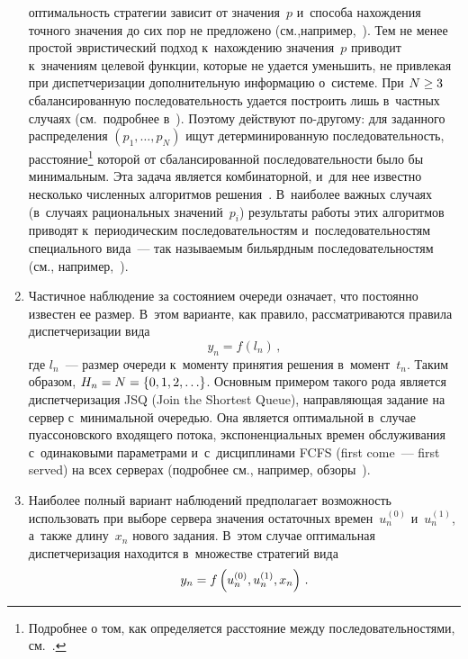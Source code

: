 \begin{multicols}{2}
\begin{enumerate}[1.]
оптимальность стратегии зависит от значения~$p$ и~способа нахождения точного 
значения до сих пор не предложено (см.,\linebreak например,~\cite{18-kon, 17-kon}). Тем не менее 
простой эвристический подход к~нахождению значения~$p$ приводит к~значениям 
целевой функции, которые не удается уменьшить, не привлекая при диспетчеризации 
дополнительную информацию о~системе. При $N\hm\geq 3$ сбалансированную 
последовательность удается построить лишь в~частных случаях (см.\ 
подробнее в~\cite{1-kon, 6-kon}). Поэтому действуют по-дру\-го\-му: для заданного 
распределения $(p_1,\ldots, p_N)$ ищут детерминированную последовательность, 
расстояние\footnote[1]{Подробнее о том, как определяется расстояние между последовательностями, 
см.~\cite{16-kon}.} которой от сбалансированной последовательности было бы 
минимальным. Эта задача является комбинаторной, и~для нее известно несколько 
численных алгоритмов решения~\cite{16-kon, 19-kon, 20-kon}. В~наиболее важных случаях 
(в~случаях рациональных значений~$p_i$) результаты работы этих алгоритмов приводят к~периодическим последовательностям и~последовательностям специального вида~--- так 
называемым бильярдным последовательностям (см., например,~\cite{16-kon}).
    \item Частичное наблюдение за состоянием очереди означает, что постоянно известен 
ее размер. В~этом варианте, как правило, рассматриваются правила диспетчеризации вида
    $$
    y_n=f(l_n)\,,
    $$
где $l_n$~--- размер очереди к~моменту принятия решения в~момент~$t_n$. Таким 
образом, $H_n\hm= N\hm= \{0,1,2,\ldots\}$. Основным примером такого рода является 
диспетчеризация JSQ (Join the Shortest Queue), направляющая задание на сервер с~минимальной очередью. Она 
является оптимальной в~случае пуассоновского входящего потока, экспоненциальных 
времен обслуживания с~одинаковыми параметрами и~с~дисциплинами FCFS (first come~--- first served)
на всех 
серверах (подробнее см., например, обзоры~\cite{3-kon, 2-kon}).
    \item Наиболее полный вариант наблюдений предполагает возможность использовать 
при выборе сервера значения остаточных времен~$u_n^{(0)}$ и~$u_n^{(1)}$, а~также 
длину~$x_n$ нового задания. В~этом случае оптимальная диспетчеризация находится 
в~множестве стратегий вида 
$$y_n\hm= f\left(u_n^{(0)}, u_n^{(1)}, x_n\right)\,. $$


\end{enumerate}
\end{multicols}

